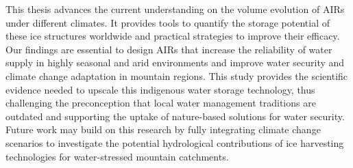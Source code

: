This thesis advances the current understanding on the volume evolution of AIRs under different climates. It
provides tools to quantify the storage potential of these ice structures worldwide and practical strategies to
improve their efficacy. Our findings are essential to design AIRs that increase the reliability of water supply
in highly seasonal and arid environments and improve water security and climate change adaptation in mountain
regions. This study provides the scientific evidence needed to upscale this indigenous water storage technology,
thus challenging the preconception that local water management traditions are outdated and supporting the uptake
of nature-based solutions for water security. Future work may build on this research by fully integrating
climate change scenarios to investigate the potential hydrological contributions of ice harvesting technologies
for water-stressed mountain catchments.
